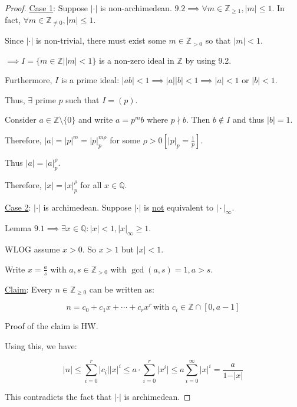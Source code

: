 \documentclass[openany]{amsbook}
\numberwithin{section}{chapter}
\theoremstyle{definition}
\begin{document}
\begin{proof}
    \underline{Case 1}: Suppose \(\vert \cdot \vert \) is non-archimedean. \(9.2 \implies \forall m\in \mathbb{Z}_{\geq 1}, \vert m \vert \leq 1\). In fact, \(\forall m\in \mathbb{Z}_{\neq 0}, \vert m \vert \leq 1\).
    
    Since \(\vert \cdot \vert\) is non-trivial, there must exist some \(m\in\mathbb{Z}_{>0}\) so that \(\vert m \vert < 1\).

    \(\implies I = \{ m\in \mathbb{Z} \mid \vert m \vert < 1 \} \) is a non-zero ideal in \(\mathbb{Z}\) by using 9.2.

    Furthermore, \(I\) is a prime ideal: \(\vert ab \vert < 1 \implies \vert a \vert \vert b \vert < 1 \implies \vert a \vert < 1 \text{ or } \vert b \vert < 1\).
    
    Thus, \(\exists\) prime \(p\) such that \(I = (p)\).

    Consider \(a\in\mathbb{Z} \setminus \{ 0 \} \) and write \(a = p^m b\) where \(p\nmid b\). Then \(b\notin I\) and thus \(\vert b \vert = 1\).

    Therefore, \(\vert a \vert = \vert p \vert ^ m = \vert p \vert_p^{m \rho}\) for some \(\rho > 0 [\vert p \vert _p = \frac{1}{p}]\).

    Thus \(\vert a \vert = \vert a \vert _ p ^ \rho\).

    Therefore, \(\vert x \vert = \vert x \vert _p^{\rho}\) for all \(x\in\mathbb{Q}\).

    \underline{Case 2}: \(\vert \cdot \vert \) is archimedean. Suppose \(\vert \cdot \vert \) is \underline{not} equivalent to \(\vert \cdot \vert _\infty\).

    Lemma \(9.1 \implies \exists x\in\mathbb{Q} : \vert x \vert < 1, \vert x \vert _\infty \geq 1\).
    
    WLOG assume \(x > 0\). So \(x > 1\) but \(\vert x \vert < 1\).

    Write \(x = \frac{a}{s}\) with \(a,s\in\mathbb{Z}_{>0}\) with \(\gcd(a,s)=1, a > s\).

    \underline{Claim}: Every \(n \in \mathbb{Z}_{\geq 0}\) can be written as:

    \[
        n = c_0 + c_1 x + \cdots + c_r x^r \, \text{with } c_i \in \mathbb{Z} \cap [0,a-1]
    \]

    Proof of the claim is HW.

    Using this, we have:

    \[
        \vert n \vert \leq \sum_{i=0}^r \vert c_i \vert \vert x \vert^i \leq a \cdot \sum_{i=0}^r \vert x^i \vert \leq a \sum_{i=0}^ \infty \vert x \vert^i = \frac{a}{1-\vert x \vert}
    \]

    This contradicts the fact that \(\vert \cdot \vert\) is archimedean.

\end{proof}
\end{document}
